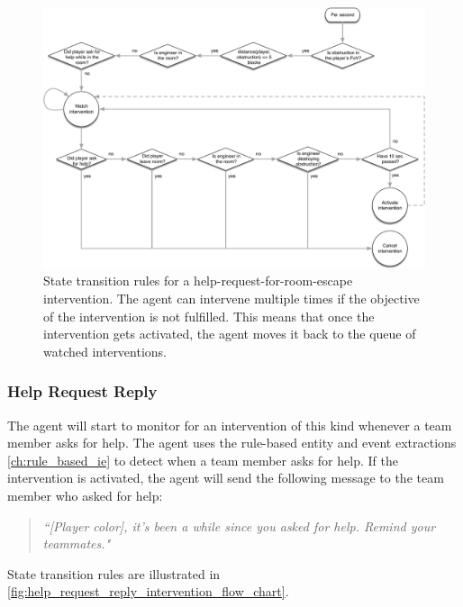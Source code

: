 %
\begin{figure}
    \centering
    \includegraphics[width=\textwidth]{images/help_request_intervention_flow_chart_re.pdf}
    \caption{%
        State transition rules for a help-request-for-room-escape intervention.
        The agent can intervene multiple times if the objective of the
        intervention is not fulfilled. This means that once the intervention
        gets activated, the agent moves it back to the queue of watched
        interventions.
    }
    \label{fig:help_request_intervention_flow_chart_re}
\end{figure}
%

\subsubsection{Help Request Reply}

The agent will start to monitor for an intervention of this kind whenever a
team member asks for help. The agent uses the rule-based entity and event
extractions \ref{ch:rule_based_ie} to detect when a team member asks for help.
If the intervention is activated, the agent will send the following message to the team
member who asked for help:

\begin{quote} 
    \emph{``[Player color], it's been a while since you asked for help. Remind
    your teammates."}
\end{quote}

\noindent State transition rules are illustrated in
\autoref{fig:help_request_reply_intervention_flow_chart}.

